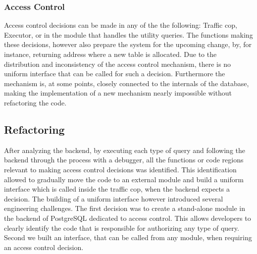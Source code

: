 \subsubsection{Access Control}
%
Access control decisions can be made in any of the the following: Traffic cop, Executor, or in the module that handles the utility queries.
%
The functions making these decisions, however also prepare the system for the upcoming change, by, for instance, returning address where a new table is allocated.
%
Due to the distribution and inconsistency of the access control mechanism, there is no uniform interface that can be called for such a decision.
%
Furthermore  the mechanism is, at some points, closely connected to the internals of the database, making the implementation of a new mechanism nearly impossible without refactoring the code.


%
\FloatBarrier

%
\subsection{Refactoring}
%
After analyzing the backend, by executing each type of query and following the backend through the process with a debugger, all the functions or code regions relevant to making access control decisions was identified.
%
This identification allowed to gradually move the code to an external module and build a uniform interface which is called inside the traffic cop, when the backend expects a decision. 
%
The building of a uniform interface however introduced several engineering challenges.
%
The first decision was to create a stand-alone module in the backend of PostgreSQL dedicated to access control.
This allows developers to clearly identify the code that is responsible for authorizing any type of query.
%
Second we built an interface, that can be called from any module, when requiring an access control decision.

